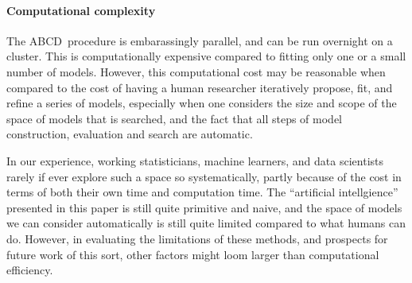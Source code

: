 \documentclass[letterpaper]{article}
\newcommand{\procedurename}{ABCD\ }
\begin{document}
\paragraph{Computational complexity}
The \procedurename procedure is embarassingly parallel, and can be run overnight on a cluster.
This is computationally expensive compared to fitting only one or a small number of models.
However, this computational cost may be reasonable when compared to the cost of having a human researcher iteratively propose, fit, and refine a series of models, especially when one considers the size and scope of the space of models that is searched, and the fact that all steps of model construction, evaluation and search are automatic.


In our experience, working statisticians, machine learners, and data scientists rarely if ever explore such a space so systematically, partly because of the cost in terms of both their own time and computation time.
The ``artificial intellgience'' presented in this paper is still quite primitive and naive, and the space of models we can consider automatically is still quite limited compared to what humans can do.
However, in evaluating the limitations of these methods, and prospects for future work of this sort, other factors might loom larger than computational efficiency.








\end{document}

